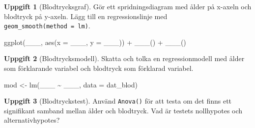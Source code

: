 \documentclass[
]{book}
\newenvironment{Shaded}{\begin{snugshade}}{\end{snugshade}}
\newcommand{\AttributeTok}[1]{\textcolor[rgb]{0.77,0.63,0.00}{#1}}
\newcommand{\FunctionTok}[1]{\textcolor[rgb]{0.00,0.00,0.00}{#1}}
\newcommand{\NormalTok}[1]{#1}
\newcommand{\OtherTok}[1]{\textcolor[rgb]{0.56,0.35,0.01}{#1}}
\newcommand{\SpecialCharTok}[1]{\textcolor[rgb]{0.00,0.00,0.00}{#1}}
\theoremstyle{definition}
\theoremstyle{definition}
\theoremstyle{definition}
\newtheorem{exercise}{Uppgift}[chapter]
\theoremstyle{definition}
\theoremstyle{remark}
\begin{document}
\begin{exercise}[Blodtrycksgraf]

Gör ett spridningsdiagram med ålder på x-axeln och blodtryck på y-axeln. Lägg till en regressionslinje med \texttt{geom\_smooth(method\ =\ lm)}.

\begin{Shaded}
\begin{Highlighting}[]
\FunctionTok{ggplot}\NormalTok{(\_\_\_, }\FunctionTok{aes}\NormalTok{(}\AttributeTok{x =}\NormalTok{ \_\_\_, }\AttributeTok{y =}\NormalTok{ \_\_\_)) }\SpecialCharTok{+}
  \FunctionTok{\_\_\_}\NormalTok{() }\SpecialCharTok{+}
  \FunctionTok{\_\_\_}\NormalTok{()}
\end{Highlighting}
\end{Shaded}

\end{exercise}

\begin{exercise}[Blodtrycksmodell]

Skatta och tolka en regressionmodell med ålder som förklarande variabel och blodtryck som förklarad variabel.

\begin{Shaded}
\begin{Highlighting}[]
\NormalTok{mod }\OtherTok{\textless{}{-}} \FunctionTok{lm}\NormalTok{(\_\_\_ }\SpecialCharTok{\textasciitilde{}}\NormalTok{ \_\_\_, }\AttributeTok{data =}\NormalTok{ dat\_blod)}
\end{Highlighting}
\end{Shaded}

\end{exercise}

\begin{exercise}[Blodtryckstest]
Använd \texttt{Anova()} för att testa om det finns ett signifikant samband mellan ålder och blodtryck. Vad är testets nollhypotes och alternativhypotes?
\end{exercise}
\end{document}
